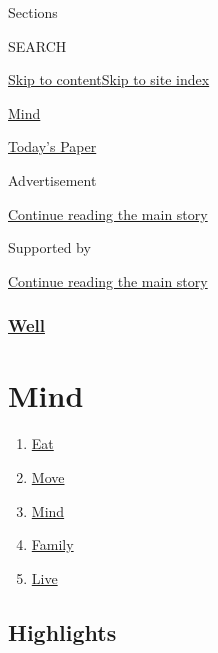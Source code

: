 Sections

SEARCH

\protect\hyperlink{site-content}{Skip to
content}\protect\hyperlink{site-index}{Skip to site index}

\href{https://www.nytimes3xbfgragh.onion/section/well/mind}{Mind}

\href{https://myaccount.nytimes3xbfgragh.onion/auth/login?response_type=cookie\&client_id=vi}{}

\href{https://www.nytimes3xbfgragh.onion/section/todayspaper}{Today's
Paper}

Advertisement

\protect\hyperlink{after-top}{Continue reading the main story}

Supported by

\protect\hyperlink{after-sponsor}{Continue reading the main story}

\hypertarget{well}{%
\subsubsection{\texorpdfstring{\href{/section/well}{Well}}{Well}}\label{well}}

\hypertarget{mind}{%
\section{Mind}\label{mind}}

\begin{enumerate}
\def\labelenumi{\arabic{enumi}.}
\tightlist
\item
  \href{/section/well/eat}{Eat}
\item
  \href{/section/well/move}{Move}
\item
  \href{/section/well/mind}{Mind}
\item
  \href{/section/well/family}{Family}
\item
  \href{/section/well/live}{Live}
\end{enumerate}

\hypertarget{highlights}{%
\subsection{Highlights}\label{highlights}}

